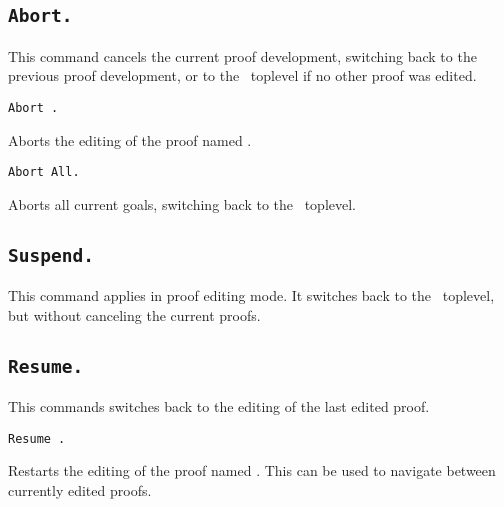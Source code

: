 \subsection{\tt Abort.}

This command cancels the current proof development, switching back to
the previous proof development, or to the \Coq\ toplevel if no other
proof was edited.

\begin{ErrMsgs}
\item {}
\end{ErrMsgs}

\begin{Variants}

\item {\tt Abort {\ident}.}

  Aborts the editing of the proof named {\ident}.

\item {\tt Abort All.}

  Aborts all current goals, switching back to the \Coq\ toplevel.

\end{Variants}

\subsection{\tt Suspend.}

This command applies in proof editing mode. It switches back to the
\Coq\ toplevel, but without canceling the current proofs.

\subsection{\tt Resume.}
\label{Resume}

This commands switches back to the editing of the last edited proof.

\begin{ErrMsgs}
\item {}
\end{ErrMsgs}

\begin{Variants}

\item {\tt Resume {\ident}.}

  Restarts the editing of the proof named {\ident}. This can be used
  to navigate between currently edited proofs.

\end{Variants}

